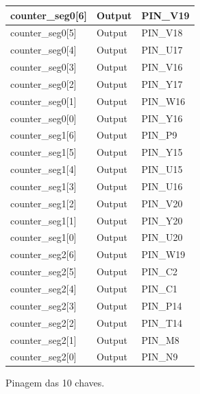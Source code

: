 \documentclass[12pt, a4paper]{article}
\begin{document}
	\begin{table}[H]
		\begin{center}
			\begin{tabular}{|l|l|l|}
				\hline
				counter\_seg0{[}6{]} & Output & PIN\_V19 \\ \hline
				counter\_seg0{[}5{]} & Output & PIN\_V18 \\ \hline
				counter\_seg0{[}4{]} & Output & PIN\_U17 \\ \hline
				counter\_seg0{[}3{]} & Output & PIN\_V16 \\ \hline
				counter\_seg0{[}2{]} & Output & PIN\_Y17 \\ \hline
				counter\_seg0{[}1{]} & Output & PIN\_W16 \\ \hline
				counter\_seg0{[}0{]} & Output & PIN\_Y16 \\ \hline
				counter\_seg1{[}6{]} & Output & PIN\_P9  \\ \hline
				counter\_seg1{[}5{]} & Output & PIN\_Y15 \\ \hline
				counter\_seg1{[}4{]} & Output & PIN\_U15 \\ \hline
				counter\_seg1{[}3{]} & Output & PIN\_U16 \\ \hline
				counter\_seg1{[}2{]} & Output & PIN\_V20 \\ \hline
				counter\_seg1{[}1{]} & Output & PIN\_Y20 \\ \hline
				counter\_seg1{[}0{]} & Output & PIN\_U20 \\ \hline
				counter\_seg2{[}6{]} & Output & PIN\_W19 \\ \hline
				counter\_seg2{[}5{]} & Output & PIN\_C2  \\ \hline
				counter\_seg2{[}4{]} & Output & PIN\_C1  \\ \hline
				counter\_seg2{[}3{]} & Output & PIN\_P14 \\ \hline
				counter\_seg2{[}2{]} & Output & PIN\_T14 \\ \hline
				counter\_seg2{[}1{]} & Output & PIN\_M8  \\ \hline
				counter\_seg2{[}0{]} & Output & PIN\_N9  \\ \hline
			\end{tabular}
		\end{center}
		
	\end{table}
	
	
	Pinagem das 10 chaves.
	
\end{document}
